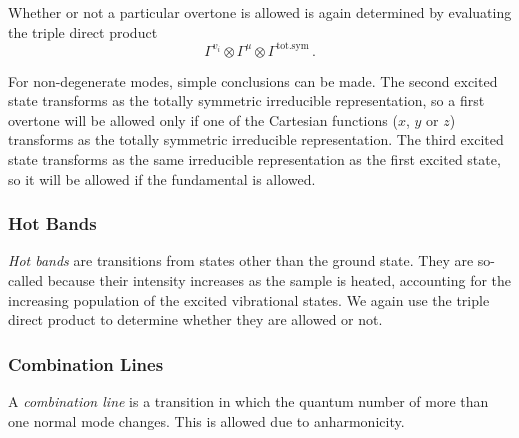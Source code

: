 \documentclass{article}
\theoremstyle{plain}\theoremheaderfont{\normalfont\itshape}\theorembodyfont{\rmfamily}\theoremseparator{.}\newtheorem*{rem}{Remark}\newtheorem*{ex}{Example}\newtheorem*{proof}{Proof}\newtheorem*{altp}{Alternative proof}
\theoremstyle{plain}\theoremheaderfont{\normalfont\bfseries}\theorembodyfont{\rmfamily}\theoremseparator{.}\newtheorem{thm}{Theorem}[section]\newtheorem{lem}[thm]{Lemma}\newtheorem{prop}[thm]{Proposition}\newtheorem*{cor}{Corollary}\newtheorem{defn}[thm]{Definition}\newtheorem{clm}[thm]{Claim}\newtheorem{clminproof}{Claim}\newtheorem{pos}{Postulate}[section]
\theoremstyle{break}\theoremheaderfont{\normalfont\itshape}\theorembodyfont{\rmfamily}\theoremseparator{.\medskip}\newtheorem*{proofskip}{Proof}\newtheorem*{exs}{Examples}\newtheorem*{rems}{Remarks}
\theoremstyle{break}\theoremheaderfont{\normalfont\bfseries}\theorembodyfont{\rmfamily}\theoremseparator{.\medskip}\newtheorem{lemskip}[thm]{Lemma}\newtheorem{defnskip}[thm]{Definition}\newtheorem{propskip}[thm]{Proposition}\newtheorem{thmskip}[thm]{Theorem}
\numberwithin{equation}{section}
\begin{document}
    Whether or not a particular overtone is allowed is again determined by evaluating the triple direct product
    \begin{equation}
        \Gamma^{v_i}\otimes\Gamma^\mu\otimes\Gamma^{\text{tot.sym}}\,.
    \end{equation}

    For non-degenerate modes, simple conclusions can be made. The second excited state transforms as the totally symmetric irreducible representation, so a first overtone will be allowed only if one of the Cartesian functions (\(x\), \(y\) or \(z\)) transforms as the totally symmetric irreducible representation. The third excited state transforms as the same irreducible representation as the first excited state, so it will be allowed if the fundamental is allowed.

    \subsubsection{Hot Bands}
    \textit{Hot bands} are transitions from states other than the ground state. They are so-called because their intensity increases as the sample is heated, accounting for the increasing population of the excited vibrational states. We again use the triple direct product to determine whether they are allowed or not.
    
    \subsubsection{Combination Lines}
    A \textit{combination line} is a transition in which the quantum number of more than one normal mode changes. This is allowed due to anharmonicity.
\end{document}
